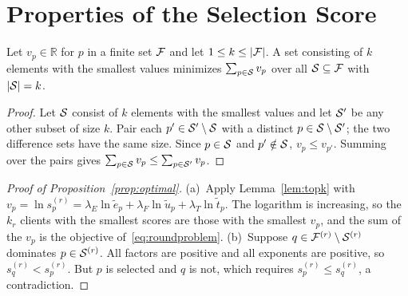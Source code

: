 \section{Properties of the Selection Score}
\label{app:score}
\begin{lemma}
	\label{lem:topk}
	Let $v_p\in\mathbb{R}$ for $p$ in a finite set $\mathcal{F}$ and let $1\le k\le|\mathcal{F}|$. A set consisting of $k$ elements with the smallest values minimizes $\sum_{p\in\mathcal{S}}v_p$ over all $\mathcal{S}\subseteq\mathcal{F}$ with $|\mathcal{S}|=k$.
\end{lemma}
\begin{proof}
	Let $\mathcal{S}$ consist of $k$ elements with the smallest values and let $\mathcal{S}'$ be any other subset of size $k$. Pair each $p'\in\mathcal{S}'\setminus\mathcal{S}$ with a distinct $p\in\mathcal{S}\setminus\mathcal{S}'$; the two difference sets have the same size. Since $p\in\mathcal{S}$ and $p'\notin\mathcal{S}$, $v_p\le v_{p'}$. Summing over the pairs gives $\sum_{p\in\mathcal{S}}v_p\le\sum_{p\in\mathcal{S}'}v_p$.
\end{proof}

\begin{proof}[Proof of Proposition~\ref{prop:optimal}]
	(a)~Apply Lemma~\ref{lem:topk} with $v_p=\ln s_p^{(r)}=\lambda_E\ln\tilde e_p+\lambda_F\ln\tilde u_p+\lambda_T\ln\tilde t_p$. The logarithm is increasing, so the $k_r$ clients with the smallest scores are those with the smallest $v_p$, and the sum of the $v_p$ is the objective of~\eqref{eq:roundproblem}. (b)~Suppose $q\in\mathcal{F}^{(r)}\setminus\mathcal{S}^{(r)}$ dominates $p\in\mathcal{S}^{(r)}$. All factors are positive and all exponents are positive, so $s_q^{(r)}<s_p^{(r)}$. But $p$ is selected and $q$ is not, which requires $s_p^{(r)}\le s_q^{(r)}$, a contradiction.
\end{proof}

